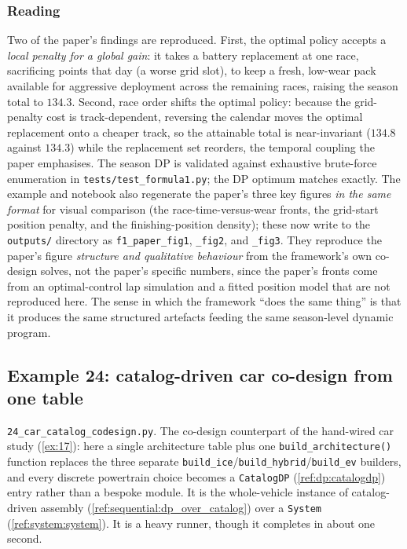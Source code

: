 \documentclass[11pt,a4paper]{article}
\begin{document}
\subsubsection*{Reading}
Two of the paper's findings are reproduced. First, the optimal policy
accepts a \emph{local penalty for a global gain}: it takes a battery
replacement at one race, sacrificing points that day (a worse grid slot),
to keep a fresh, low-wear pack available for aggressive deployment across
the remaining races, raising the season total to $134.3$. Second, race
order shifts the optimal policy: because the grid-penalty cost is
track-dependent, reversing the calendar moves the optimal replacement onto
a cheaper track, so the attainable total is near-invariant ($134.8$
against $134.3$) while the replacement set reorders, the temporal coupling
the paper emphasises. The season DP is validated against exhaustive
brute-force enumeration in \texttt{tests/test\_formula1.py}; the DP optimum
matches exactly. The example and notebook also regenerate the paper's
three key figures \emph{in the same format} for visual comparison (the
race-time-versus-wear fronts, the grid-start position penalty, and the
finishing-position density); these now write to the \texttt{outputs/}
directory as \texttt{f1\_paper\_fig1}, \texttt{\_fig2}, and \texttt{\_fig3}.
They reproduce the paper's figure \emph{structure and qualitative
behaviour} from the
framework's own co-design solves, not the paper's specific numbers, since
the paper's fronts come from an optimal-control lap simulation and a
fitted position model that are not reproduced here. The sense in which the
framework ``does the same thing'' is that it produces the same structured
artefacts feeding the same season-level dynamic program.

\subsection{Example 24: catalog-driven car co-design from one table}
\label{ex:24}

\texttt{24\_car\_catalog\_codesign.py}. The co-design counterpart of the
hand-wired car study (\ref{ex:17}): here a single architecture table plus
one \texttt{build\_architecture()} function replaces the three separate
\texttt{build\_ice}/\texttt{build\_hybrid}/\texttt{build\_ev} builders, and
every discrete powertrain choice becomes a \texttt{CatalogDP}
(\ref{ref:dp:catalogdp}) entry rather than a bespoke module. It is the
whole-vehicle instance of catalog-driven assembly
(\ref{ref:sequential:dp_over_catalog}) over a \texttt{System}
(\ref{ref:system:system}). It is a heavy runner, though it completes in
about one second.
\end{document}
